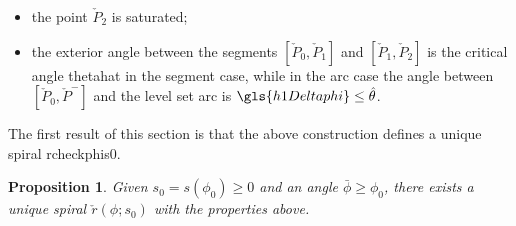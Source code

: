 \documentclass[reqno]{amsart}
\theoremstyle{definition} \newtheorem{definition}{Definition}[section]
\theoremstyle{definition} \newtheorem{remark}[definition]{Remark}
\theoremstyle{plain} \newtheorem{lemma}[definition]{Lemma}
\theoremstyle{plain} \newtheorem{proposition}[definition]{Proposition}
\theoremstyle{plain} \newtheorem{theorem}[definition]{Theorem}
\theoremstyle{plain} \newtheorem{corollary}[definition]{Corollary}
\theoremstyle{definition} \newtheorem{example}[definition]{Example}
\theoremstyle{plain} \newtheorem{claim}[clai]{Claim}
\theoremstyle{definition} \newtheorem{assumption}[definition]{Assumption}
\theoremstyle{definition} \newtheorem{observation}[definition]{Observation}
\newcommand{\1}{\mathbbm 1}
\numberwithin{equation}{section} %
\theoremstyle{plain} \newtheorem*{theorem*}{Theorem}
\theoremstyle{plain} \newtheorem{mthm}[maintheorem]{Main Theorem}
\theoremstyle{plain} \newtheorem*{mthm*}{Main Theorem}
\theoremstyle{plain} \newtheorem*{conjecture*}{Conjecture}
\theoremstyle{plain} \newtheorem{conjecture}[definition]{Conjecture}
\theoremstyle{plain} \newtheorem*{problem*}{Problem}
\begin{document}
\begin{itemize}
\item the point $\check P_2$ is saturated;
\item the exterior angle between the segments $[\check P_0,\check P_1]$ and $[\check P_1,\check P_2]$ is the critical angle \gls{thetahat} in the segment case, while in the arc case the angle between $[\check P_0,\check P^-]$ and the level set arc is $\gls{h1Deltaphi} \leq \hat \theta$.
\end{itemize}



The first result of this section is that the above construction defines a unique spiral  \gls{rcheckphis0}.

\begin{proposition}
\label{Prop:unique_optimal_guess}
Given $s_0 = s(\phi_0) \geq 0$ and an angle $\bar \phi \geq \phi_0$, there exists a unique spiral $\check r(\phi;s_0)$ with the properties above.
\end{proposition}
%	
%	
%
%
\end{document}
